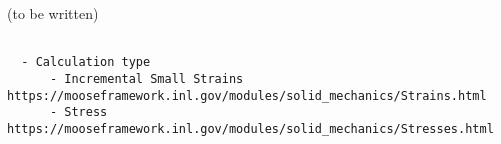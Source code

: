 (to be written)

\begin{verbatim}
    
  - Calculation type
      - Incremental Small Strains https://mooseframework.inl.gov/modules/solid_mechanics/Strains.html
      - Stress https://mooseframework.inl.gov/modules/solid_mechanics/Stresses.html 

\end{verbatim}

